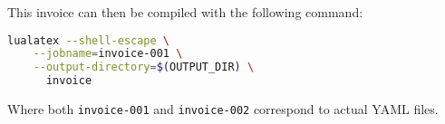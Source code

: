 This invoice can then be compiled with the following command:
\begin{lstlisting}[language=bash]
lualatex --shell-escape \
    --jobname=invoice-001 \
    --output-directory=$(OUTPUT_DIR) \
      invoice
\end{lstlisting}
Where both \texttt{invoice-001} and \texttt{invoice-002} correspond to actual YAML files.

